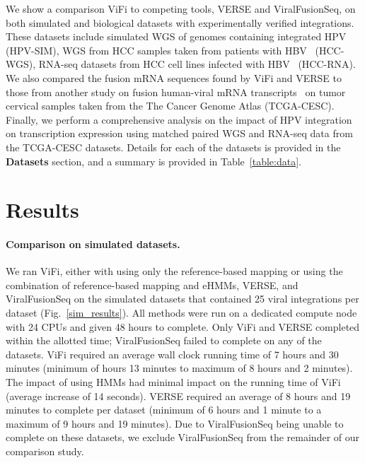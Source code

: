 \documentclass[10pt]{article}
\begin{document}
We show a comparison ViFi to competing tools, VERSE and ViralFusionSeq, on both simulated and biological datasets with experimentally verified integrations.  These datasets include simulated WGS of genomes containing integrated HPV (HPV-SIM), WGS from HCC samples taken from patients with HBV~\cite{Sung2012} (HCC-WGS), RNA-seq datasets from HCC cell lines infected with HBV~\cite{Lau2014} (HCC-RNA).  We also compared the fusion mRNA sequences found by ViFi and VERSE to those from another study on fusion human-viral mRNA transcripts~\cite{Tang2013} on tumor cervical samples taken from the The Cancer Genome Atlas (TCGA-CESC).  Finally, we perform a comprehensive analysis on the impact of HPV integration on transcription expression using matched paired WGS and RNA-seq data from the TCGA-CESC datasets.  Details for each of the datasets is provided in the \textbf{Datasets} section, and a summary is provided in Table~\ref{table:data}. 


\section{Results}

\paragraph{\textbf{Comparison on simulated datasets.}}  We ran ViFi, either with using only the reference-based mapping or using the combination of reference-based mapping and eHMMs, VERSE, and ViralFusionSeq on the simulated datasets that contained 25 viral integrations per dataset (Fig.~\ref{sim_results}).  All methods were run on a dedicated compute node with 24 CPUs and given 48 hours to complete.  Only ViFi and VERSE completed within the allotted time; ViralFusionSeq failed to complete on any of the datasets.  ViFi required an average wall clock running time of 7 hours and 30 minutes (minimum of hours 13 minutes to maximum of 8 hours and 2 minutes).  The impact of using HMMs had minimal impact on the running time of ViFi (average increase of 14 seconds).  VERSE required an average of 8 hours and 19 minutes to complete per dataset (minimum of 6 hours and 1 minute to a maximum of 9 hours and 19 minutes).  Due to ViralFusionSeq being unable to complete on these datasets, we exclude ViralFusionSeq from the remainder of our comparison study.
\end{document}
